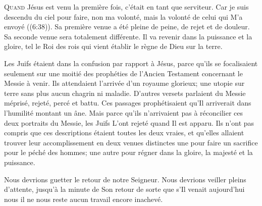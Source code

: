 \dvrule







\lettrine{Q}{uand} Jésus est venu la première fois,
 c'était en tant que serviteur.
 \Og Car je suis descendu du ciel pour faire, non ma volonté,
 mais la volonté de celui qui M'a envoyé \Fg{} ((6:38)).
 Sa première venue a été pleine de peine, de rejet et de douleur.
 Sa seconde venue sera totalement différente.
 Il va revenir dans la puissance et la gloire, tel
 \Og le  Roi des rois \Fg{} 
 qui vient établir le règne de Dieu sur la terre.

Les Juifs étaient dans la confusion par rapport à Jésus,
 parce qu'ils se focalisaient seulement sur une moitié des prophéties
 de l'Ancien Testament concernant le Messie à venir.
 Ils attendaient l'arrivée d'un royaume glorieux;
 une utopie sur terre sans plus aucun chagrin ni maladie.
 D'autres versets parlaient du Messie méprisé, rejeté, percé et battu.
 Ces passages prophétisaient qu'Il arriverait dans l'humilité montant un âne.
 Mais parce qu'ils n'arrivaient pas à réconcilier ces deux portraits
 du Messie, les Juifs L'ont rejeté quand Il est apparu.
 Ils n'ont pas compris que ces descriptions étaient toutes les deux vraies,
 et qu'elles allaient trouver leur accomplissement en deux venues distinctes\frcolon{}
 une pour faire un sacrifice pour le péché des hommes;
 une autre pour régner dans la gloire, la majesté et la puissance.


Nous devrions guetter le retour de notre Seigneur.
 Nous devrions veiller pleins d'attente, jusqu'à la minute de Son retour
 \ocadr de sorte que s'Il venait aujourd'hui
 nous il ne nous reste aucun travail encore inachevé.

\dvrule

